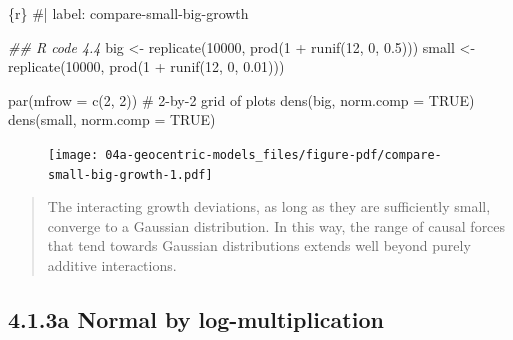 \documentclass[
  letterpaper,
  DIV=11,
  numbers=noendperiod]{scrreprt}
\newenvironment{Shaded}{\begin{snugshade}}{\end{snugshade}}
\newcommand{\AttributeTok}[1]{\textcolor[rgb]{0.40,0.45,0.13}{#1}}
\newcommand{\CommentTok}[1]{\textcolor[rgb]{0.37,0.37,0.37}{#1}}
\newcommand{\ConstantTok}[1]{\textcolor[rgb]{0.56,0.35,0.01}{#1}}
\newcommand{\DecValTok}[1]{\textcolor[rgb]{0.68,0.00,0.00}{#1}}
\newcommand{\DocumentationTok}[1]{\textcolor[rgb]{0.37,0.37,0.37}{\textit{#1}}}
\newcommand{\FloatTok}[1]{\textcolor[rgb]{0.68,0.00,0.00}{#1}}
\newcommand{\FunctionTok}[1]{\textcolor[rgb]{0.28,0.35,0.67}{#1}}
\newcommand{\InformationTok}[1]{\textcolor[rgb]{0.37,0.37,0.37}{#1}}
\newcommand{\NormalTok}[1]{\textcolor[rgb]{0.00,0.23,0.31}{#1}}
\newcommand{\OtherTok}[1]{\textcolor[rgb]{0.00,0.23,0.31}{#1}}
\newcommand{\SpecialCharTok}[1]{\textcolor[rgb]{0.37,0.37,0.37}{#1}}
\begin{document}
\begin{Shaded}
\begin{Highlighting}[]
\InformationTok{\textasciigrave{}\textasciigrave{}\textasciigrave{}\{r\}}
\CommentTok{\#| label: compare{-}small{-}big{-}growth}

\DocumentationTok{\#\# R code 4.4}
\NormalTok{big }\OtherTok{\textless{}{-}} \FunctionTok{replicate}\NormalTok{(}\DecValTok{10000}\NormalTok{, }\FunctionTok{prod}\NormalTok{(}\DecValTok{1} \SpecialCharTok{+} \FunctionTok{runif}\NormalTok{(}\DecValTok{12}\NormalTok{, }\DecValTok{0}\NormalTok{, }\FloatTok{0.5}\NormalTok{)))}
\NormalTok{small }\OtherTok{\textless{}{-}} \FunctionTok{replicate}\NormalTok{(}\DecValTok{10000}\NormalTok{, }\FunctionTok{prod}\NormalTok{(}\DecValTok{1} \SpecialCharTok{+} \FunctionTok{runif}\NormalTok{(}\DecValTok{12}\NormalTok{, }\DecValTok{0}\NormalTok{, }\FloatTok{0.01}\NormalTok{)))}

\FunctionTok{par}\NormalTok{(}\AttributeTok{mfrow =} \FunctionTok{c}\NormalTok{(}\DecValTok{2}\NormalTok{, }\DecValTok{2}\NormalTok{)) }\CommentTok{\# 2{-}by{-}2 grid of plots}
\FunctionTok{dens}\NormalTok{(big, }\AttributeTok{norm.comp =} \ConstantTok{TRUE}\NormalTok{)}
\FunctionTok{dens}\NormalTok{(small, }\AttributeTok{norm.comp =} \ConstantTok{TRUE}\NormalTok{)}
\InformationTok{\textasciigrave{}\textasciigrave{}\textasciigrave{}}
\end{Highlighting}
\end{Shaded}

\begin{figure}[H]

{\centering \texttt{[image: 04a-geocentric-models\_files/figure-pdf/compare-small-big-growth-1.pdf]}

}

\end{figure}

\begin{quote}
The interacting growth deviations, as long as they are sufficiently
small, converge to a Gaussian distribution. In this way, the range of
causal forces that tend towards Gaussian distributions extends well
beyond purely additive interactions.
\end{quote}

\hypertarget{a-normal-by-log-multiplication}{%
\subsection{4.1.3a Normal by
log-multiplication}\label{a-normal-by-log-multiplication}}
\end{document}
